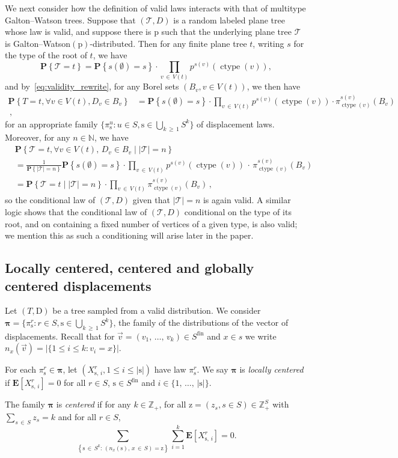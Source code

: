 \documentclass[AHL,Unicode,longabstracts,published]{cedram}
\providecommand{\N}{}
\renewcommand{\N}{\mathbb{N}}
\newcommand{\bbZ}{\mathbb{Z}}
\newcommand{\cT}{\mathcal{T}}
\newcommand{\rD}{\mathrm{D}}
\newcommand{\bE}{\mathbf{E}}
\newcommand{\rs}{\mathrm{s}}
\newcommand{\rz}{\mathrm{z}}
\newcommand{\rp}{\mathrm{p}}
\DeclareMathOperator{\cht}{ctype}
\DeclareMathOperator{\fin}{fin}
\newcommand{\E}[1]{\mathbf{E}\left[#1\right]}
\newcommand{\p}[1]{\mathbf{P}\left\{#1\right\}}
\newcommand{\set}[1]{\left\{ #1 \right\}}
\newcommand{\probC}[2]{\mathbf{P}\set{#1 \; \left| \; #2 \right.}}
\let\oldforall\forall
\renewcommand*{\forall}{\mathrel{\oldforall}}
\begin{document}
We next consider how the definition of valid laws interacts with that of multitype Galton--Watson trees. Suppose that $(\cT,D)$ is a random labeled plane tree whose law is valid, and suppose there is $\rp$ such that the underlying plane tree $\cT$ is Galton--Watson$(\rp)$-distributed. Then for any finite plane tree $t$, writing $s$ for the type of the root of $t$, we have
\[
\p{\cT=t} = \p{s(\emptyset)=s}\cdot \prod_{v\,\in\,V(t)} p^{s(v)}(\cht(v)),
\]
and by~\eqref{eq:validity_rewrite}, for any Borel sets $(B_v,v \in V(t))$, we then have
\begin{align*}
\p{T=t, \forall v \in V(t), D_v \in B_v} & = \p{s(\emptyset)=s}\cdot \prod_{v\,\in\,V(t)} p^{s(v)}(\cht(v))\cdot\pi^{s(v)}_{\cht(v)}(B_v)\\
\,,
\end{align*}
for an appropriate family $\{\pi^u_{\rs}: u \in S, \rs \in \bigcup_{k\,\ge\,1} S^k\}$ of displacement laws. Moreover, for any $n \in \N$, we have
\begin{align*}
& \probC{\cT=t, \forall v \in V(t),\,D_v \in B_v}{|\cT|=n} \\
& = \frac{1}{\p{|\cT|=n}}\p{s(\emptyset)=s}\cdot \prod_{v\,\in\,V(t)} p^{s(v)}(\cht(v))\,\cdot\,\pi^{s(v)}_{\cht(v)}(B_v) \\
& = \probC{\cT=t}{|\cT|=n}
\cdot \prod_{v\,\in\,V(t)} \pi^{s(v)}_{\cht(v)}(B_v)\,,
\end{align*}
so the conditional law of $(\cT,D)$ given that $|\cT|=n$ is again valid. A similar logic shows that the conditional law of $(\cT,D)$ conditional on the type of its root, and on containing a fixed number of vertices of a given type, is also valid; we mention this as such a conditioning will arise later in the paper.


\subsection{Locally centered, centered and globally centered displacements}\label{sub:centering}
Let $(T,\rD)$ be a tree sampled from a valid distribution. We consider $\bm{\pi}=\{\pi^r_{\rs}: r \in S, \rs \in \bigcup_{k\,\ge\,1} S^k\}$, the family of the distributions of the vector of displacements. Recall that for $\vec{v} =(v_1,\,\ldots,\,v_k)\in S^{\fin}$ and $x \in s$ we write $n_x(\vec{v})=|\{1 \le i \le k:v_i=x\}|$.

\begin{defi}
For each $\pi^r_{\rs}\in \bm{\pi}$, let $(X^r_{\rs,\,i},1\leq i \leq |\rs|)$ have law $\pi^r_\rs$. We say $\bm{\pi}$ is \emph{locally centered} if $\bE[X^r_{\rs,\,i}]=0$ for all $r\in S$, $\rs \in S^{\fin}$ and $i\in \{1,\,\ldots,\,|\rs|\}$.

The family $\bm{\pi}$ is \emph{centered} if for any $k\in \bbZ_+$, for all $\rz=(z_s,s \in S)\in \bbZ_+^{S}$ with $\sum_{s\,\in\,S} z_s=k$ and for all $r\in S$,
\[
\sum_{\left\{\rs\,\in\,S^k:\,\left(n_x(\rs),\,x\,\in\,S\right)=\rz\right\}} \sum_{i=1}^k\E{X^r_{\rs,\,i}}=0.
\]
\end{defi}
\end{document}
